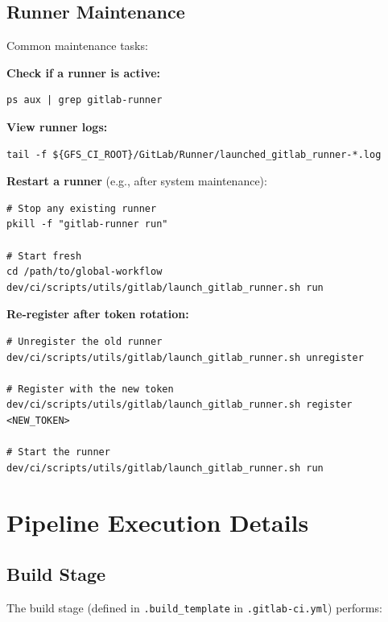 \documentclass[11pt,letterpaper,twoside]{article}
\begin{document}
\subsection{Runner Maintenance}
\label{sec:runner-maint}

Common maintenance tasks:

\textbf{Check if a runner is active:}
\begin{lstlisting}[style=bash, numbers=none]
ps aux | grep gitlab-runner
\end{lstlisting}

\textbf{View runner logs:}
\begin{lstlisting}[style=bash, numbers=none]
tail -f ${GFS_CI_ROOT}/GitLab/Runner/launched_gitlab_runner-*.log
\end{lstlisting}

\textbf{Restart a runner} (e.g., after system maintenance):
\begin{lstlisting}[style=bash, numbers=none]
# Stop any existing runner
pkill -f "gitlab-runner run"

# Start fresh
cd /path/to/global-workflow
dev/ci/scripts/utils/gitlab/launch_gitlab_runner.sh run
\end{lstlisting}

\textbf{Re-register after token rotation:}
\begin{lstlisting}[style=bash, numbers=none]
# Unregister the old runner
dev/ci/scripts/utils/gitlab/launch_gitlab_runner.sh unregister

# Register with the new token
dev/ci/scripts/utils/gitlab/launch_gitlab_runner.sh register <NEW_TOKEN>

# Start the runner
dev/ci/scripts/utils/gitlab/launch_gitlab_runner.sh run
\end{lstlisting}


\section{Pipeline Execution Details}
\label{sec:execution}

\subsection{Build Stage}
\label{sec:build-stage}

The build stage (defined in \texttt{.build\_template} in
\texttt{.gitlab-ci.yml}) performs:
\end{document}
